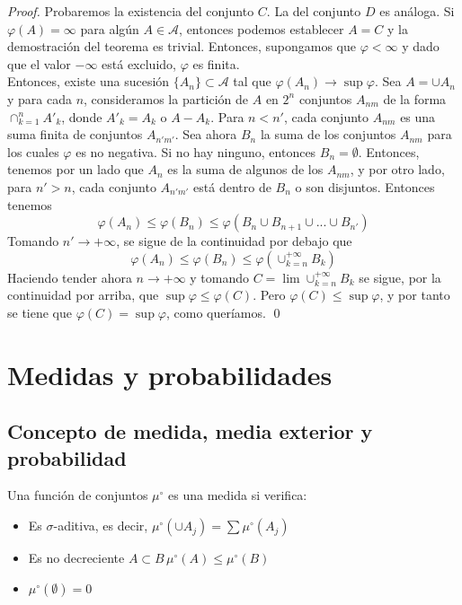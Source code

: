 \begin{proof}
Probaremos la existencia del conjunto $C$. La del conjunto $D$ es análoga. Si $\varphi(A) = \infty$ para algún $A \in \mathcal{A}$, entonces podemos establecer $A = C$ y la demostración del teorema es trivial. Entonces, supongamos que $\varphi < \infty$ y dado que el valor $-\infty$ está excluido, $\varphi$ es finita.\\

Entonces, existe una sucesión $\{A_n\} \subset \mathcal{A}$ tal que $\varphi(A_n) \to \sup \varphi$. Sea $A = \cup A_n $ y para cada $n$, consideramos la partición de $A$ en $2^n$ conjuntos $A_{nm}$ de la forma $\displaystyle \cap_{k=1}^n A'_k$, donde $A'_k = A_k$ o $A - A_k$. Para $n < n'$, cada conjunto $A_{nm}$ es una suma finita de conjuntos $A_{n'm'}$. Sea ahora $B_n$ la suma de los conjuntos $A_{nm}$ para los cuales $\varphi$ es no negativa. Si no hay ninguno, entonces $B_n = \emptyset$. Entonces, tenemos por un lado que $A_n$ es la suma de algunos de los $A_{nm}$, y por otro lado, para $n' > n$, cada conjunto $A_{n'm'}$ está dentro de $B_n$ o son disjuntos. Entonces tenemos
$$ \varphi(A_n) \leq \varphi(B_n) \leq \varphi (B_n \cup B_{n+1} \cup ... \cup B_{n'}) $$
Tomando $n' \to +\infty$, se sigue de la continuidad por debajo que
$$ \varphi(A_n) \leq \varphi (B_n) \leq \varphi \left( \cup_{k=n}^{+\infty} B_k\right) $$
Haciendo tender ahora $n \to +\infty$ y tomando $\displaystyle C = \lim \cup_{k = n}^{+\infty} B_k$ se sigue, por la continuidad por arriba, que $\sup \varphi \leq \varphi(C)$. Pero $\varphi(C) \leq \sup \varphi$, y por tanto se tiene que $\varphi(C) = \sup \varphi$, como queríamos.
\qed
\end{proof}

\chapter{Medidas y probabilidades}

\section{Concepto de medida, media exterior y probabilidad}
Una función de conjuntos $\mu^\circ$ es una medida si verifica:
\begin{itemize}
\item Es $\sigma$-aditiva, es decir,  $\mu^\circ (\cup A_j) = \displaystyle \sum \mu^\circ (A_j)$
\item Es no decreciente $A\subset B \, \mu^\circ(A)\leq \mu^\circ(B)$
\item $\mu^\circ(\emptyset)=0$
\end{itemize}

